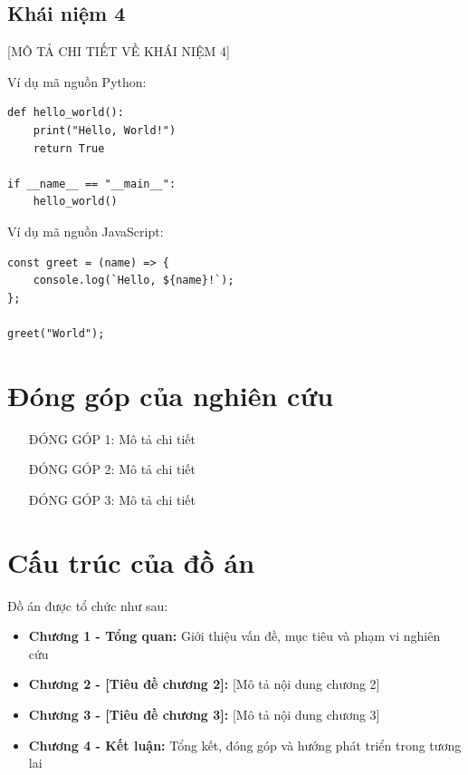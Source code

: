 \subsection{Khái niệm 4}

[MÔ TẢ CHI TIẾT VỀ KHÁI NIỆM 4]

Ví dụ mã nguồn Python:
\begin{verbatim}
def hello_world():
    print("Hello, World!")
    return True

if __name__ == "__main__":
    hello_world()
\end{verbatim}

Ví dụ mã nguồn JavaScript:
\begin{verbatim}
const greet = (name) => {
    console.log(`Hello, ${name}!`);
};

greet("World");
\end{verbatim}

\section{Đóng góp của nghiên cứu}

\begin{enumerate}
    \item [ĐÓNG GÓP 1: Mô tả chi tiết]
    \item [ĐÓNG GÓP 2: Mô tả chi tiết]
    \item [ĐÓNG GÓP 3: Mô tả chi tiết]
\end{enumerate}

\section{Cấu trúc của đồ án}

Đồ án được tổ chức như sau:

\begin{itemize}
    \item \textbf{Chương 1 - Tổng quan:} Giới thiệu vấn đề, mục tiêu và phạm vi nghiên cứu
    \item \textbf{Chương 2 - [Tiêu đề chương 2]:} [Mô tả nội dung chương 2]
    \item \textbf{Chương 3 - [Tiêu đề chương 3]:} [Mô tả nội dung chương 3]
    \item \textbf{Chương 4 - Kết luận:} Tổng kết, đóng góp và hướng phát triển trong tương lai
\end{itemize}
